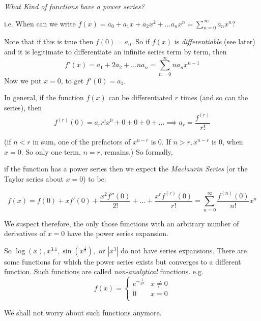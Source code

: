 \documentclass[10pt]{scrartcl}
\begin{document}
 














\textit{What Kind of functions have a power series?}

i.e. When can we write $\displaystyle{f(x) = a_0 + a_1x + a_2x^2 + \dots a_nx^n = \sum_{n=0}^{\infty} a_nx^n}$?

Note that if this is true then $f(0) = a_0$. So if $f(x)$ is \emph{differentiable} (see later)  and it is legitimate to differentiate an infinite series term by term, then \[f'(x) = a_1 + 2a_2 + \dots na_n = \sum_{n=0}^{\infty} na_nx^{n-1}\] Now we put $x=0$, to get $f'(0) = a_1$.

In general, if the function $f(x)$ can be differentiated $r$ times (and so can the series), then \[f^{(r)}(0) = a_r r!x^0 + 0 + 0 + 0 + \dots \implies \boxed{a_r = \dfrac{f^{(r)}}{r!}}\]

(if $n<r$ in sum, one of the prefactors of $x^{n-r}$ is 0. If $n>r, x^{n-r}$ is 0, when $x=0$. So only one term, $n=r$, remains.) So formally,

\begin{definition} if the function has a power series then we expect the \emph{Maclaurin Series} (or the Taylor series about $x=0$) to be:

\[\displaystyle{f(x) = f(0) + xf'(0) + \frac{x^2f''(0)}{2!} + \dots + \frac{x^rf^{(r)}(0)}{r!} = \sum_{n=0}^{\infty} \frac{f^{(n)}(0)}{n!} x^n}\]

\end{definition}

We suspect therefore, the only those functions with an arbitrary number of derivatives of $x=0$ have the power series expansion.

So $\log(x), x^{3.1}, \sin(x^{\frac{1}{2}}),$ or $|x^3|$ do not have series expansions. There are some functions for which the power series exists but converges to a different function. Such functions are called \emph{non-analytical} functions. e.g.
\[f(x) = \begin{cases}
 e^{-\frac{1}{x^2}} & x \neq 0\\
0 & x=0\\
 \end{cases}\]
 
 We shall not worry about such functions anymore.
 
\end{document}

